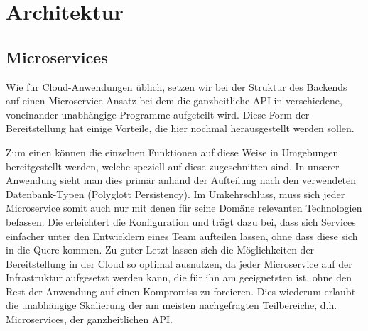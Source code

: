 \documentclass{article}
\begin{document}
\section{Architektur} %
\subsection{Microservices}

Wie für Cloud-Anwendungen üblich, setzen wir bei der Struktur des Backends auf einen Microservice-Ansatz bei dem die ganzheitliche API in verschiedene, voneinander unabhängige Programme aufgeteilt wird. Diese Form der Bereitstellung hat einige Vorteile, die hier nochmal herausgestellt werden sollen.

Zum einen können die einzelnen Funktionen auf diese Weise in Umgebungen bereitgestellt werden, welche speziell auf diese zugeschnitten sind. In unserer Anwendung sieht man dies primär anhand der Aufteilung nach den verwendeten Datenbank-Typen (Polyglott Persistency). Im Umkehrschluss, muss sich jeder Microservice somit auch nur mit denen für seine Domäne relevanten Technologien befassen. Die erleichtert die Konfiguration und trägt dazu bei, dass sich Services einfacher unter den Entwicklern eines Team aufteilen lassen, ohne dass diese sich in die Quere kommen. Zu guter Letzt lassen sich die Möglichkeiten der Bereitstellung in der Cloud so optimal ausnutzen, da jeder Microservice auf der Infrastruktur aufgesetzt werden kann, die für ihn am geeignetsten ist, ohne den Rest der Anwendung auf einen Kompromiss zu forcieren. Dies wiederum erlaubt die unabhängige Skalierung der am meisten nachgefragten Teilbereiche, d.h. Microservices, der ganzheitlichen API. 
\end{document}
